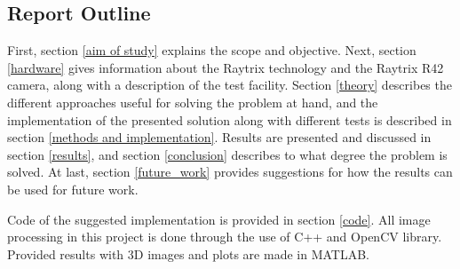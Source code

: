 \subsection{Report Outline} \label{report_outline}

First, section \ref{aim of study} explains the scope and objective. Next, section \ref{hardware} gives information about the Raytrix technology and the Raytrix R42 camera, along with a description of the test facility.
Section \ref{theory} describes the different approaches useful for solving the problem at hand, and the implementation of the presented solution along with different tests is described in section \ref{methods and implementation}.
Results are presented and discussed in section \ref{results}, and section \ref{conclusion} describes to what degree the problem is solved.
At last, section \ref{future_work} provides suggestions for how the results can be used for future work.

Code of the suggested implementation is provided in section \ref{code}.
All image processing in this project is done through the use of C++ and OpenCV library. Provided results with 3D images and plots are made in MATLAB.



